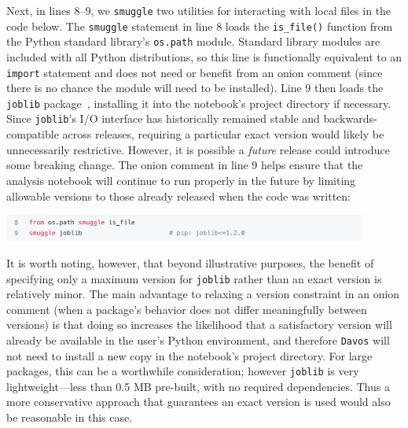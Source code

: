 \documentclass[preprint,12pt,a4paper]{elsarticle}
\begin{document}
Next, in lines 8--9, we \texttt{smuggle} two
utilities for interacting with local files in the code below. The
\texttt{smuggle} statement in line 8 loads the \texttt{is\_file()}
function from the Python standard library's \texttt{os.path}
module. Standard library modules are included with all Python
distributions, so this line is functionally equivalent to an
\texttt{import} statement and does not need or benefit from an onion
comment (since there is no chance the module will need to be installed).
Line 9 then loads the \texttt{joblib} package~\cite{Varo10},
installing it into the notebook's project directory if necessary. Since \texttt{joblib}'s I/O
interface has historically remained stable and backwards-compatible
across releases, requiring a particular exact version
would likely be unnecessarily restrictive. However, it is possible a
\textit{future} release could introduce some breaking change. The
onion comment in line 9 helps ensure that the analysis notebook will continue
to run properly in the future by limiting allowable versions to those
already released when the code was written:
\begin{center}
\includegraphics[width=0.9\textwidth]{figs/example2}
\end{center}
It is worth noting, however, that beyond illustrative purposes, the benefit of specifying only a maximum version for \texttt{joblib} rather than an exact version is relatively minor.
The main advantage to relaxing a version constraint in an onion comment (when a package's behavior does not differ meaningfully between versions) is that doing so increases the likelihood that a satisfactory version will already be available in the user's Python environment, and therefore \texttt{Davos} will not need to install a new copy in the notebook's project directory.
For large packages, this can be a worthwhile consideration; however \texttt{joblib} is very lightweight---less than 0.5 MB pre-built, with no required dependencies.
Thus a more conservative approach that guarantees an exact version is used would also be reasonable in this case.
\end{document}
